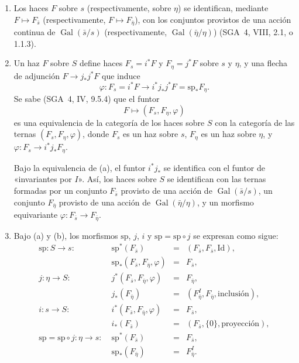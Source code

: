 \begin{enumerate}[label=(\alph*)]
\item Los haces $F$ sobre $s$ (respectivamente, sobre $\eta$) se identifican,
mediante $F\mapsto F_{\bar s}$ (respectivamente,
$F\mapsto F_{\bar\eta}$), con los conjuntos provistos de una acción continua
de $\operatorname{Gal}(\bar s/s)$ (respectivamente,
$\operatorname{Gal}(\bar\eta/\eta)$) (SGA~4, VIII, 2.1, o 1.1.3).

\item Un haz $F$ sobre $S$ define haces $F_s=i^*F$ y $F_\eta=j^*F$ sobre
$s$ y $\eta$, y una flecha de adjunción $F\longrightarrow j_*j^*F$ que induce
\begin{equation*}
\varphi:F_s=i^*F\longrightarrow i^*j_*j^*F
=\mathrm{sp}_*F_\eta.
\end{equation*}
Se sabe (SGA~4, IV, 9.5.4) que el funtor
\begin{equation*}
F\longmapsto(F_s,F_\eta,\varphi)
\end{equation*}
es una equivalencia de la categoría de los haces sobre $S$ con la categoría
de las ternas $(F_s,F_\eta,\varphi)$, donde $F_s$ es un haz sobre $s$,
$F_\eta$ es un haz sobre $\eta$, y
$\varphi:F_s\longrightarrow i^*j_*F_\eta$.

Bajo la equivalencia de (a), el funtor $i^*j_*$ se identifica con el funtor
de «invariantes por $I$». Así, los haces sobre $S$ se identifican con las
ternas formadas por un conjunto $F_{\bar s}$ provisto de una acción de
$\operatorname{Gal}(\bar s/s)$, un conjunto $F_{\bar\eta}$ provisto de una
acción de $\operatorname{Gal}(\bar\eta/\eta)$, y un morfismo equivariante
$\varphi:F_{\bar s}\longrightarrow F_{\bar\eta}$.

\item Bajo (a) y (b), los morfismos $\mathrm{sp}$, $j$, $i$ y
$\mathrm{sp}=\mathrm{sp}\circ j$ se expresan como sigue:
\begin{equation*}
\begin{array}{llcl}
\mathrm{sp}:S\longrightarrow s:\;&
 \mathrm{sp}^*(F_{\bar s})&=&(F_{\bar s},F_{\bar s},\mathrm{Id}),\\[2pt]
&\mathrm{sp}_*(F_{\bar s},F_{\bar\eta},\varphi)&=&F_{\bar s},\\[3pt]
j:\eta\longrightarrow S:\;&
 j^*(F_{\bar s},F_{\bar\eta},\varphi)&=&F_{\bar\eta},\\[2pt]
&j_*(F_{\bar\eta})&=&(F_{\bar\eta}^{I},F_{\bar\eta},
 \text{inclusión}),\\[3pt]
i:s\longrightarrow S:\;&
 i^*(F_{\bar s},F_{\bar\eta},\varphi)&=&F_{\bar s},\\[2pt]
&i_*(F_{\bar s})&=&(F_{\bar s},\{0\},\text{proyección}),\\[3pt]
\mathrm{sp}=\mathrm{sp}\circ j:\eta\longrightarrow s:\;&
 \mathrm{sp}^*(F_{\bar s})&=&F_{\bar s},\\[2pt]
&\mathrm{sp}_*(F_{\bar\eta})&=&F_{\bar\eta}^{I}.
\end{array}
\end{equation*}
\end{enumerate}

